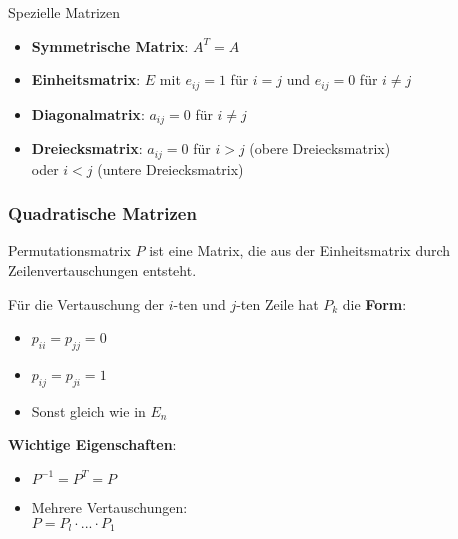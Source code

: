     \begin{KR}{Spezielle Matrizen}
        \begin{itemize}
            \item \textbf{Symmetrische Matrix}: $A^T = A$
            \item \textbf{Einheitsmatrix}: $E$ mit $e_{ij} = 1$ für $i = j$ und $e_{ij} = 0$ für $i \neq j$
            \item \textbf{Diagonalmatrix}: $a_{ij} = 0$ für $i \neq j$
            \item \textbf{Dreiecksmatrix}: $a_{ij} = 0$ für $i > j$ (obere Dreiecksmatrix) \\oder $i < j$ (untere Dreiecksmatrix)
        \end{itemize}
    \end{KR}

  


\subsubsection{Quadratische Matrizen}

\begin{concept}{Permutationsmatrix} $P$ ist eine Matrix, die aus der Einheitsmatrix durch Zeilenvertauschungen entsteht. 
    \vspace{1mm}\\
    \begin{minipage}[t]{0.5\textwidth}
        Für die Vertauschung der $i$-ten und $j$-ten Zeile hat $P_k$ die \textbf{Form}:
        \begin{itemize}
            \item $p_{ii} = p_{jj} = 0$ 
            \item $p_{ij} = p_{ji} = 1$
            \item Sonst gleich wie in $E_n$
        \end{itemize}
    \end{minipage}
    \hspace{3mm}
    \begin{minipage}[t]{0.45\textwidth}
        \vspace{1mm}
        \textbf{Wichtige Eigenschaften}:
        \begin{itemize}
            \item $P^{-1} = P^T = P$
            \item Mehrere Vertauschungen:\\ $P = P_l \cdot ... \cdot P_1$
        \end{itemize}
    \end{minipage}
\end{concept}
  
